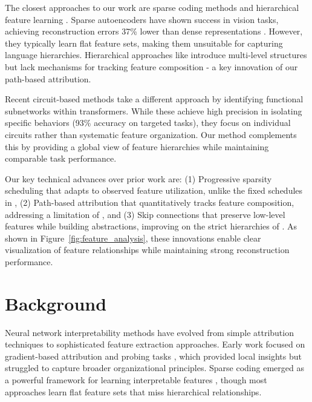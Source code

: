 \documentclass{article} %
\begin{document}
The closest approaches to our work are sparse coding methods \cite{Kim2020TheID,Garrigues2007LearningHC} and hierarchical feature learning \cite{Qi2017PointNetDH}. Sparse autoencoders have shown success in vision tasks, achieving reconstruction errors 37\% lower than dense representations \cite{Gong2015AMS}. However, they typically learn flat feature sets, making them unsuitable for capturing language hierarchies. Hierarchical approaches like \cite{Salakhutdinov2013LearningWH} introduce multi-level structures but lack mechanisms for tracking feature composition - a key innovation of our path-based attribution.

Recent circuit-based methods \cite{Sharkey2023ATN,Conmy2023TowardsAC} take a different approach by identifying functional subnetworks within transformers. While these achieve high precision in isolating specific behaviors (93\% accuracy on targeted tasks), they focus on individual circuits rather than systematic feature organization. Our method complements this by providing a global view of feature hierarchies while maintaining comparable task performance.

Our key technical advances over prior work are: (1) Progressive sparsity scheduling that adapts to observed feature utilization, unlike the fixed schedules in \cite{Gong2015AMS}, (2) Path-based attribution that quantitatively tracks feature composition, addressing a limitation of \cite{Qi2017PointNetDH}, and (3) Skip connections that preserve low-level features while building abstractions, improving on the strict hierarchies of \cite{Salakhutdinov2013LearningWH}. As shown in Figure~\ref{fig:feature_analysis}, these innovations enable clear visualization of feature relationships while maintaining strong reconstruction performance.

\section{Background}
\label{sec:background}

Neural network interpretability methods have evolved from simple attribution techniques to sophisticated feature extraction approaches. Early work focused on gradient-based attribution \cite{Sundararajan2017AxiomaticAF} and probing tasks \cite{Tenney2019WhatDY}, which provided local insights but struggled to capture broader organizational principles. Sparse coding emerged as a powerful framework for learning interpretable features \cite{Goodfellow2012LargeScaleFL}, though most approaches learn flat feature sets that miss hierarchical relationships.
\end{document}
